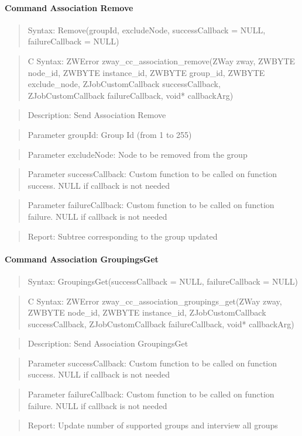 \paragraph{Command Association Remove}
\begin{quote}Syntax: Remove(groupId, excludeNode, successCallback = NULL, failureCallback = NULL)\end{quote}
\begin{quote}C Syntax: ZWError zway\_cc\_association\_remove(ZWay zway, ZWBYTE node\_id, ZWBYTE instance\_id, ZWBYTE group\_id, ZWBYTE exclude\_node, ZJobCustomCallback successCallback, ZJobCustomCallback failureCallback, void* callbackArg)\end{quote}
\begin{quote}Description: Send Association Remove\end{quote}
\begin{quote}Parameter groupId: Group Id (from 1 to 255)\end{quote}
\begin{quote}Parameter excludeNode: Node to be removed from the group\end{quote}
\begin{quote}Parameter successCallback: Custom function to be called on function success. NULL if callback is not needed\end{quote}
\begin{quote}Parameter failureCallback: Custom function to be called on function failure. NULL if callback is not needed\end{quote}
\begin{quote}Report: Subtree corresponding to the group updated\end{quote}

\paragraph{Command Association GroupingsGet}
\begin{quote}Syntax: GroupingsGet(successCallback = NULL, failureCallback = NULL)\end{quote}
\begin{quote}C Syntax: ZWError zway\_cc\_association\_groupings\_get(ZWay zway, ZWBYTE node\_id, ZWBYTE instance\_id, ZJobCustomCallback successCallback, ZJobCustomCallback failureCallback, void* callbackArg)\end{quote}
\begin{quote}Description: Send Association GroupingsGet\end{quote}
\begin{quote}Parameter successCallback: Custom function to be called on function success. NULL if callback is not needed\end{quote}
\begin{quote}Parameter failureCallback: Custom function to be called on function failure. NULL if callback is not needed\end{quote}
\begin{quote}Report: Update number of supported groups and interview all groups\end{quote}


